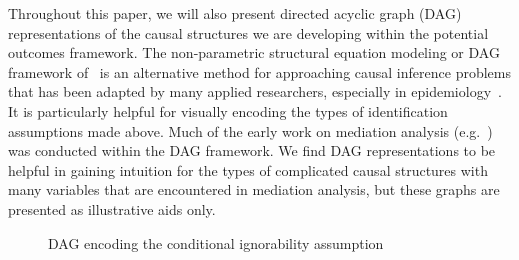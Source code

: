 Throughout this paper, we will also present directed acyclic graph (DAG) representations of the causal structures 
we are developing within the potential outcomes framework. The non-parametric structural equation 
modeling or DAG framework of~\cite{pearl2000} is an alternative method 
for approaching causal inference problems that has been adapted by many applied researchers, especially in 
epidemiology~\citep{hernan2024}. It is particularly helpful for visually encoding the types of identification 
assumptions made above. Much of the early work on mediation analysis (e.g.~\citep{pearl2001,avinetal2005}) was
conducted within the DAG framework. We find DAG representations to be helpful in gaining intuition for the types of 
complicated causal structures with many variables that are encountered in mediation analysis, but these graphs are 
presented as illustrative aids only. 

\begin{figure}[ht]
\centering
{}
\caption{DAG encoding the conditional ignorability assumption}
\label{fig:ignorability_dag}
\end{figure}

